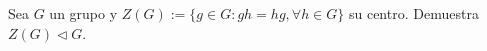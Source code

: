 \question 
Sea $G$ un grupo y $Z(G):=\{g\in G: gh=hg, \forall h \in G\}$ su centro. Demuestra $Z(G) \triangleleft G$.